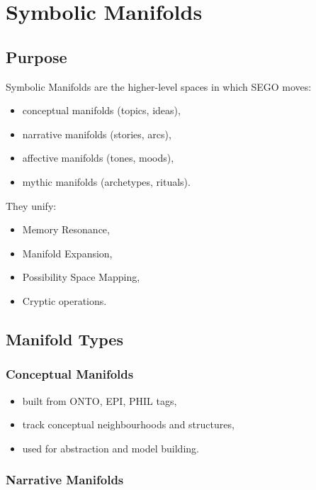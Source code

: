 \chapter{Symbolic Manifolds}
\label{chap:Symbolic_Manifolds}

\section{Purpose}

Symbolic Manifolds are the higher-level spaces in which SEGO moves:
\begin{itemize}
    \item conceptual manifolds (topics, ideas),
    \item narrative manifolds (stories, arcs),
    \item affective manifolds (tones, moods),
    \item mythic manifolds (archetypes, rituals).
\end{itemize}

They unify:
\begin{itemize}
    \item Memory Resonance,
    \item Manifold Expansion,
    \item Possibility Space Mapping,
    \item Cryptic operations.
\end{itemize}

\section{Manifold Types}

\subsection{Conceptual Manifolds}

\begin{itemize}
    \item built from ONTO, EPI, PHIL tags,
    \item track conceptual neighbourhoods and structures,
    \item used for abstraction and model building.
\end{itemize}

\subsection{Narrative Manifolds}

